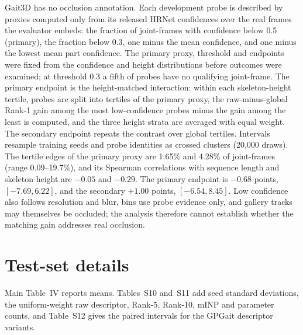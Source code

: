 \documentclass[11pt]{article}
\newcommand{\tablesetup}{\small\setlength{\tabcolsep}{4pt}}
\begin{document}
Gait3D has no occlusion annotation. Each development probe is described by
proxies computed only from its released HRNet confidences over the real frames
the evaluator embeds: the fraction of joint-frames with confidence below 0.5
(primary), the fraction below 0.3, one minus the mean confidence, and one minus
the lowest mean part confidence. The primary proxy, threshold and endpoints were
fixed from the confidence and height distributions before outcomes were
examined; at threshold 0.3 a fifth of probes have no qualifying joint-frame.
The primary endpoint is the height-matched interaction: within each
skeleton-height tertile, probes are split into tertiles of the primary proxy,
the raw-minus-global Rank-1 gain among the most low-confidence probes minus the
gain among the least is computed, and the three height strata are averaged with
equal weight. The secondary endpoint repeats the contrast over global tertiles.
Intervals resample training seeds and probe identities as crossed clusters
(20,000 draws). The tertile edges of the primary proxy are 1.65\% and 4.28\% of
joint-frames (range 0.09--19.7\%), and its Spearman correlations with
sequence length and skeleton height are $-0.05$ and $-0.29$. The primary
endpoint is $-0.68$ points, $[-7.69,6.22]$, and the secondary $+1.00$ points,
$[-6.54,8.45]$. Low confidence also follows resolution and blur, bins use probe
evidence only, and gallery tracks may themselves be occluded; the analysis
therefore cannot establish whether the matching gain addresses real
occlusion.

\section{Test-set details}
\label{sec:s-test}

Main Table~IV reports means. Tables~S10 and~S11 add seed standard deviations,
the uniform-weight raw descriptor, Rank-5, Rank-10, mINP and parameter counts,
and Table~S12 gives the paired intervals for the GPGait descriptor variants.

\begin{table}[!htbp]
\centering
\caption{CASIA-B official test (identities 075--124), standard single-view
protocol excluding identical views, Rank-1 (\%). Our rows give mean $\pm$
standard deviation over five seeds of the metric baseline; reproduced
baselines were trained once with official FastPoseGait configurations, and
reported values are those of the FastPoseGait model zoo. Parameters include
each model's identity classifier.}
\label{tab:s-casia-test}
{\tablesetup\footnotesize
}
\end{table}
\end{document}
